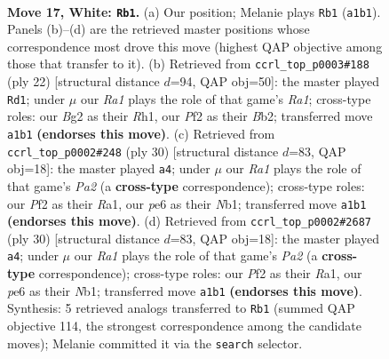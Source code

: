 \documentclass[11pt]{article}
\begin{document}
\clearpage

\begin{figure}[p]\centering
\begin{subfigure}{0.46\textwidth}\centering
\resizebox{\linewidth}{!}{%
\newchessgame
\chessboard[
  setfen={1nb2rk1/r5b1/1p2pn2/p1p2pp1/2P4p/1P4P1/P2NPPBP/R1BNR1K1 w - - 0 17},
  showmover=false,
  pgfstyle=straightmove, color=movearrow, markmove={a1-b1}
]}
\caption{}
\end{subfigure}\hfill
\begin{subfigure}{0.46\textwidth}\centering
\resizebox{\linewidth}{!}{%
\newchessgame
\chessboard[
  setfen={rn1k3r/1ppb2bp/5np1/4pp2/p1P4P/1PN1P3/PB2BPP1/R3K1NR w KQ - 0 12},
  showmover=false,
  pgfstyle=straightmove, color=movearrow, markmove={a1-d1}
]}
\caption{}
\end{subfigure}
\\[4pt]
\begin{subfigure}{0.46\textwidth}\centering
\resizebox{\linewidth}{!}{%
\newchessgame
\chessboard[
  setfen={2kr3r/1bp3bp/pp4p1/3nPp2/3p1P2/3P4/PPP3PP/RNB1NRK1 w - - 1 16},
  showmover=false,
  pgfstyle=straightmove, color=movearrow, markmove={a2-a4}
]}
\caption{}
\end{subfigure}\hfill
\begin{subfigure}{0.46\textwidth}\centering
\resizebox{\linewidth}{!}{%
\newchessgame
\chessboard[
  setfen={2kr3r/1bp3bp/pp4p1/3nPp2/3p1P2/3P4/PPP3PP/RNB1NRK1 w - - 1 16},
  showmover=false,
  pgfstyle=straightmove, color=movearrow, markmove={a2-a4}
]}
\caption{}
\end{subfigure}
\caption{\textbf{Move 17, White: \texttt{Rb1}.} (a) Our position; Melanie plays \texttt{Rb1} (\texttt{a1b1}). Panels (b)--(d) are the retrieved master positions whose correspondence most drove this move (highest QAP objective among those that transfer to it). (b) Retrieved from \texttt{ccrl\_top\_p0003\#188} (ply 22) [structural distance $d$=94, QAP obj=50]: the master played \texttt{Rd1}; under $\mu$ our \emph{Ra1} plays the role of that game's \emph{Ra1}; cross-type roles: our \emph{B}g2 as their \emph{R}h1, our \emph{P}f2 as their \emph{B}b2; transferred move \texttt{a1b1} \textbf{(endorses this move)}. (c) Retrieved from \texttt{ccrl\_top\_p0002\#248} (ply 30) [structural distance $d$=83, QAP obj=18]: the master played \texttt{a4}; under $\mu$ our \emph{Ra1} plays the role of that game's \emph{Pa2} (a \textbf{cross-type} correspondence); cross-type roles: our \emph{P}f2 as their \emph{R}a1, our \emph{p}e6 as their \emph{N}b1; transferred move \texttt{a1b1} \textbf{(endorses this move)}. (d) Retrieved from \texttt{ccrl\_top\_p0002\#2687} (ply 30) [structural distance $d$=83, QAP obj=18]: the master played \texttt{a4}; under $\mu$ our \emph{Ra1} plays the role of that game's \emph{Pa2} (a \textbf{cross-type} correspondence); cross-type roles: our \emph{P}f2 as their \emph{R}a1, our \emph{p}e6 as their \emph{N}b1; transferred move \texttt{a1b1} \textbf{(endorses this move)}. Synthesis: 5 retrieved analogs transferred to \texttt{Rb1} (summed QAP objective 114, the strongest correspondence among the candidate moves); Melanie committed it via the \texttt{search} selector.}
\label{fig:thought-m32}
\end{figure}
\end{document}
